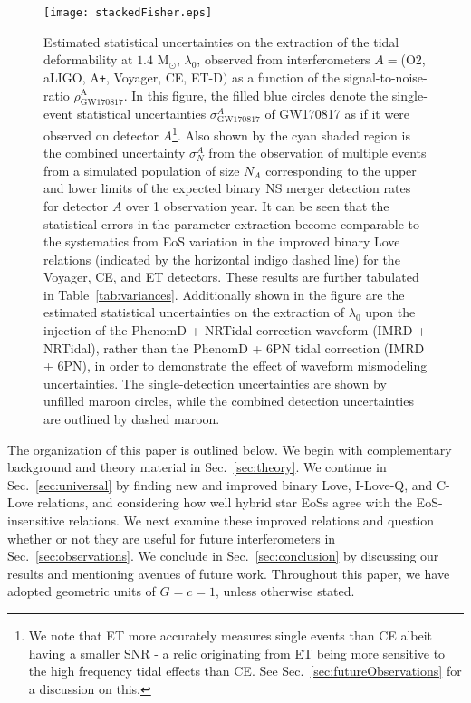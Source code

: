 \documentclass[prd,twocolumn,nofootinbib,superscriptaddress,amsmath,amssymb]{revtex4-1}
\begin{document}
\begin{figure}
\begin{center} 
\texttt{[image: stackedFisher.eps]}
\end{center}
\caption{
Estimated statistical uncertainties on the extraction of the tidal deformability at $1.4 \text{ M}_{\odot}$, $\lambda_0$, observed from interferometers $A=$(O2, aLIGO, A\texttt{+}, Voyager, CE, ET-D$)$ as a function of the signal-to-noise-ratio $\rho^{\text{A}}_{\text{GW170817}}$.
In this figure, the filled blue circles denote the single-event statistical uncertainties $\sigma^A_{\text{GW170817}}$ of GW170817 as if it were observed on detector $A$\footnote{We note that ET more accurately measures single events than CE albeit having a smaller SNR - a relic originating from ET being more sensitive to the high frequency tidal effects than CE. See Sec.~\ref{sec:futureObservations} for a discussion on this.}.
Also shown by the cyan shaded region is the combined uncertainty $\sigma^A_N$ from the observation of multiple events from a simulated population of size $N_A$ corresponding to the upper and lower limits of the expected binary NS merger detection rates for detector $A$ over 1 observation year.
It can be seen that the statistical errors in the parameter extraction become comparable to the systematics from EoS variation in the improved binary Love relations (indicated by the horizontal indigo dashed line) for the Voyager, CE, and ET detectors.
These results are further tabulated in Table~\ref{tab:variances}.
Additionally shown in the figure are the estimated statistical uncertainties on the extraction of $\lambda_0$ upon the injection of the PhenomD + NRTidal correction waveform (IMRD + NRTidal), rather than the PhenomD + 6PN tidal correction (IMRD + 6PN), in order to demonstrate the effect of waveform mismodeling uncertainties.
The single-detection uncertainties are shown by unfilled maroon circles, while the combined detection uncertainties are outlined by dashed maroon.
}
\label{fig:stackedFisher}
\end{figure} 

The organization of this paper is outlined below.
We begin with complementary background and theory material in Sec.~\ref{sec:theory}.
We continue in Sec.~\ref{sec:universal} by finding new and improved binary Love, I-Love-Q, and C-Love relations, and considering how well hybrid star EoSs agree with the EoS-insensitive relations.
We next examine these improved relations and question whether or not they are useful for future interferometers in Sec.~\ref{sec:observations}.
We conclude in Sec.~\ref{sec:conclusion} by discussing our results and mentioning avenues of future work.
Throughout this paper, we have adopted geometric units of $G=c=1$, unless otherwise stated.
\end{document}
